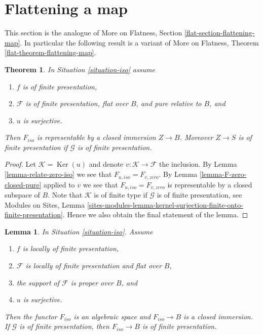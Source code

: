 \documentclass{stacks-project}
\theoremstyle{plain}
\newtheorem{theorem}[subsection]{Theorem}
\newtheorem{lemma}[subsection]{Lemma}
\theoremstyle{definition}
\theoremstyle{remark}
\numberwithin{equation}{subsection}
\def\Ker{\mathop{\mathrm{Ker}}}
\begin{document}
\section{Flattening a map}
\label{section-flattening-map}

\noindent
This section is the analogue of
More on Flatness, Section \ref{flat-section-flattening-map}.
In particular the following result is a variant of
More on Flatness, Theorem \ref{flat-theorem-flattening-map}.

\begin{theorem}
\label{theorem-flattening-map}
In Situation \ref{situation-iso} assume
\begin{enumerate}
\item $f$ is of finite presentation,
\item $\mathcal{F}$ is of finite presentation, flat over $B$, and
pure relative to $B$, and
\item $u$ is surjective.
\end{enumerate}
Then $F_{iso}$ is representable by a closed immersion $Z \to B$.
Moreover $Z \to S$ is of finite presentation if $\mathcal{G}$ is
of finite presentation.
\end{theorem}

\begin{proof}
Let $\mathcal{K} = \Ker(u)$ and denote $v : \mathcal{K} \to \mathcal{F}$
the inclusion. By Lemma \ref{lemma-relate-zero-iso} we see that
$F_{u, iso} = F_{v, zero}$. By Lemma \ref{lemma-F-zero-closed-pure}
applied to $v$ we see that $F_{u, iso} = F_{v, zero}$ is representable
by a closed subspace of $B$. Note that $\mathcal{K}$ is of finite type
if $\mathcal{G}$ is of finite presentation, see
Modules on Sites, Lemma
\ref{sites-modules-lemma-kernel-surjection-finite-onto-finite-presentation}.
Hence we also obtain the final statement of the lemma.
\end{proof}

\begin{lemma}
\label{lemma-F-iso-closed}
In Situation \ref{situation-iso}. Assume
\begin{enumerate}
\item $f$ is locally of finite presentation,
\item $\mathcal{F}$ is locally of finite presentation and flat over $B$,
\item the support of $\mathcal{F}$ is proper over $B$, and
\item $u$ is surjective.
\end{enumerate}
Then the functor $F_{iso}$ is an algebraic space and $F_{iso} \to B$
is a closed immersion. If $\mathcal{G}$ is of finite presentation, then
$F_{iso} \to B$ is of finite presentation.
\end{lemma}
\end{document}
